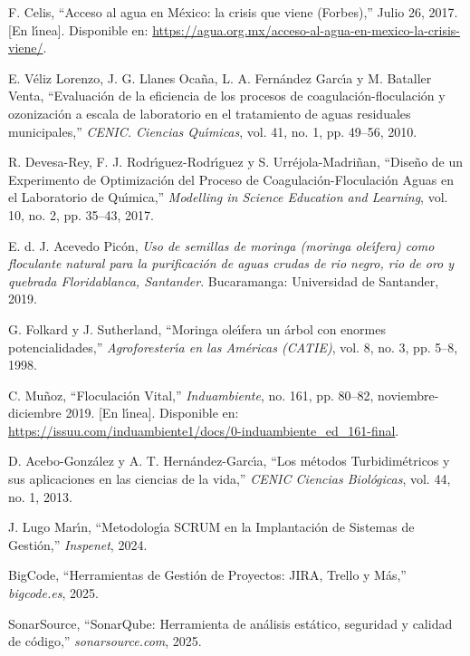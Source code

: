 \documentclass[conference]{IEEEtran}
\begin{document}
		
	\begin{thebibliography}{00}
		 F. Celis, ``Acceso al agua en M\'exico: la crisis que viene (Forbes),'' Julio 26, 2017. [En l\'{\i}nea]. Disponible en: \url{https://agua.org.mx/acceso-al-agua-en-mexico-la-crisis-viene/}.
		
		 E. V\'eliz Lorenzo, J. G. Llanes Oca\~na, L. A. Fern\'andez Garc\'{\i}a y M. Bataller Venta, ``Evaluaci\'on de la eficiencia de los procesos de coagulaci\'on-floculaci\'on y ozonizaci\'on a escala de laboratorio en el tratamiento de aguas residuales municipales,'' \textit{CENIC. Ciencias Qu\'{\i}micas}, vol. 41, no. 1, pp. 49--56, 2010.
		
		 R. Devesa-Rey, F. J. Rodr\'{\i}guez-Rodr\'{\i}guez y S. Urr\'ejola-Madri\~nan, ``Dise\~no de un Experimento de Optimizaci\'on del Proceso de Coagulaci\'on-Floculaci\'on Aguas en el Laboratorio de Qu\'{\i}mica,'' \textit{Modelling in Science Education and Learning}, vol. 10, no. 2, pp. 35--43, 2017.
		
		 E. d. J. Acevedo Pic\'on, \textit{Uso de semillas de moringa (moringa ole\'{\i}fera) como floculante natural para la purificaci\'on de aguas crudas de rio negro, rio de oro y quebrada Floridablanca, Santander}. Bucaramanga: Universidad de Santander, 2019.
		
		 G. Folkard y J. Sutherland, ``Moringa ole\'{\i}fera un \'arbol con enormes potencialidades,'' \textit{Agroforester\'{\i}a en las Am\'ericas (CATIE)}, vol. 8, no. 3, pp. 5--8, 1998.
		
		 C. Mu\~noz, ``Floculaci\'on Vital,'' \textit{Induambiente}, no. 161, pp. 80--82, noviembre-diciembre 2019. [En l\'{\i}nea]. Disponible en: \url{https://issuu.com/induambiente1/docs/0-induambiente_ed_161-final}.
		
		 D. Acebo-Gonz\'alez y A. T. Hern\'andez-Garc\'{\i}a, ``Los m\'etodos Turbidim\'etricos y sus aplicaciones en las ciencias de la vida,'' \textit{CENIC Ciencias Biol\'ogicas}, vol. 44, no. 1, 2013.
		
		  J. Lugo Mar\'{\i}n, ``Metodolog\'{\i}a SCRUM en la Implantaci\'on de Sistemas de Gesti\'on,'' \textit{Inspenet}, 2024.
		
		 BigCode, ``Herramientas de Gesti\'on de Proyectos: JIRA, Trello y M\'as,'' \textit{bigcode.es}, 2025.
		
		 SonarSource, ``SonarQube: Herramienta de an\'alisis est\'atico, seguridad y calidad de c\'odigo,'' \textit{sonarsource.com}, 2025.
		

\end{thebibliography}
\end{document}
